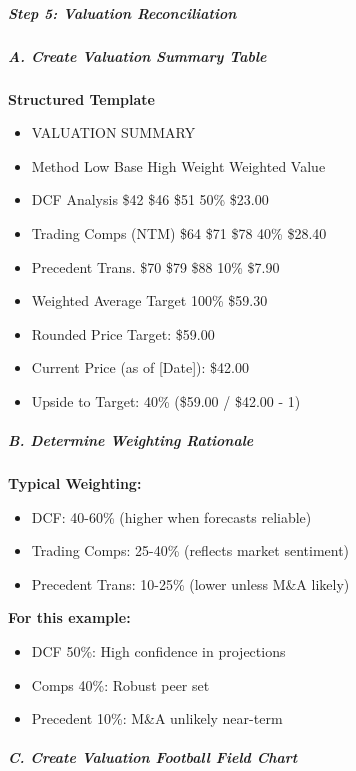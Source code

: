 \documentclass[11pt]{article}
\begin{document}
\subparagraph{Step 5: Valuation Reconciliation}\mbox{}\par

\subparagraph{A. Create Valuation Summary Table}\mbox{}\par

\textbf{Structured Template}
\begin{itemize}[leftmargin=*,itemsep=2pt,topsep=2pt]
\item {} VALUATION SUMMARY
\item {} Method Low Base High Weight Weighted Value
\item {} DCF Analysis \$42 \$46 \$51 50\% \$23.00
\item {} Trading Comps (NTM) \$64 \$71 \$78 40\% \$28.40
\item {} Precedent Trans. \$70 \$79 \$88 10\% \$7.90
\item {} Weighted Average Target 100\% \$59.30
\item {} Rounded Price Target: \$59.00
\item {} Current Price (as of [Date]): \$42.00
\item {} Upside to Target: 40\% (\$59.00 / \$42.00 - 1)
\end{itemize}

\subparagraph{B. Determine Weighting Rationale}\mbox{}\par

\textbf{Typical Weighting:}

\begin{itemize}[leftmargin=*,itemsep=2pt,topsep=2pt]
\item {} DCF: 40-60\% (higher when forecasts reliable)
\item {} Trading Comps: 25-40\% (reflects market sentiment)
\item {} Precedent Trans: 10-25\% (lower unless M\&A likely)
\end{itemize}

\textbf{For this example:}

\begin{itemize}[leftmargin=*,itemsep=2pt,topsep=2pt]
\item {} DCF 50\%: High confidence in projections
\item {} Comps 40\%: Robust peer set
\item {} Precedent 10\%: M\&A unlikely near-term
\end{itemize}

\subparagraph{C. Create Valuation Football Field Chart}\mbox{}\par
\end{document}

